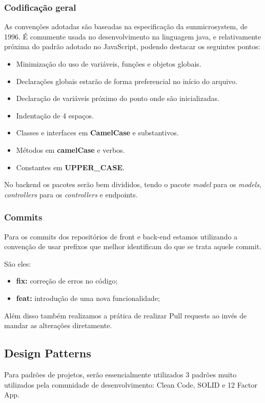 \subsubsection{Codificação geral}
As convenções adotadas são baseadas na especificação da \gls{sunmicrosystem}, de 1996. É comumente usada no desenvolvimento na linguagem java, e relativamente próxima do padrão adotado no JavaScript, podendo destacar os seguintes pontos:

\begin{itemize}
    \item Minimização do uso de variáveis, funções e objetos globais.
    \item Declarações globais estarão de forma preferencial no início do arquivo.
    \item Declaração de variáveis próximo do ponto onde são inicializadas.
    \item Indentação de 4 espaços.
    \item Classes e interfaces em \textbf{CamelCase} e substantivos.
    \item Métodos em \textbf{camelCase} e verbos.
    \item Constantes em \textbf{UPPER\_CASE}.
\end{itemize}

No \gls{backend} os pacotes serão bem divididos, tendo o pacote \emph{model} para os \emph{models}, \emph{controllers} para os \emph{controllers} e \glspl{endpoint}.

\subsubsection{Commits}
Para os commits dos repositórios de front e back-end estamos utilizando a convenção de usar prefixos que melhor identificam do que se trata aquele commit.

São eles:
\begin{itemize}
	\item \textbf{fix:} correção de erros no código;
	\item \textbf{feat:} introdução de uma nova funcionalidade;
\end{itemize}

Além disso também realizamos a prática de realizar Pull requests ao invés de mandar as alterações diretamente.

\subsection{Design Patterns}
Para padrões de projetos, serão essencialmente utilizados 3 padrões muito utilizados pela comunidade de desenvolvimento: Clean Code, SOLID e 12 Factor App.

